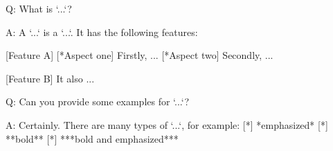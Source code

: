 \documentclass[%
  numbered answer,
  numbered question,
]{Q-and-A}
\begin{document}
Q:
What is `...`?

A:
A `...` is a `...`. It has the following features:

[Feature A]
[*Aspect one] Firstly, ...
[*Aspect two] Secondly, ...

[Feature B]
It also ...

Q:
Can you provide some examples for `...`?

A:
Certainly. There are many types of `...`, for example:
[*] *emphasized*
[*] **bold**
[*] ***bold and emphasized***
\end{document}
